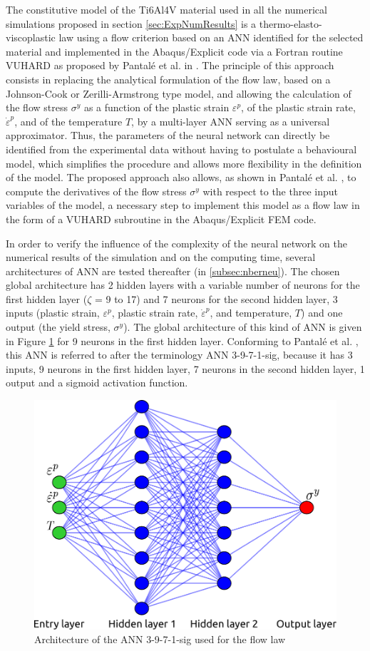 \documentclass[preprint,12pt,times]{elsarticle}
\begin{document}
The constitutive model of the Ti6Al4V material used in all the numerical simulations proposed in section \ref{sec:ExpNumResults} is a thermo-elasto-viscoplastic law using a flow criterion based on an ANN identified for the selected material and implemented in the Abaqus/Explicit code via a Fortran routine VUHARD as proposed by Pantalé et al. in \cite{pantale_Efficient_2022}.
The principle of this approach consists in replacing the analytical formulation of the flow law, based on a Johnson-Cook or Zerilli-Armstrong type model, and allowing the calculation of the flow stress $\sigma^y$ as a function of the plastic strain $\varepsilon^p$, of the plastic strain rate, ${\dot{\varepsilon}}^p$, and of the temperature $T$, by a multi-layer ANN serving as a universal approximator. Thus, the parameters of the neural network can directly be identified from the experimental data without having to postulate a behavioural model, which simplifies the procedure and allows more flexibility in the definition of the model.
The proposed approach also allows, as shown in Pantalé et al. \cite{pantale_Efficient_2022}, to compute the derivatives of the flow stress $\sigma^y$ with respect to the three input variables of the model, a necessary step to implement this model as a flow law in the form of a VUHARD subroutine in the Abaqus/Explicit FEM code.

In order to verify the influence of the complexity of the neural network on the numerical results of the simulation and on the computing time, several architectures of ANN are tested thereafter (in \ref{subsec:nberneu}). The chosen global architecture has 2 hidden layers with a variable number of neurons for the first hidden layer ($\zeta$ = 9 to 17) and 7 neurons for the second hidden layer, 3 inputs (plastic strain, $\varepsilon^p$, plastic strain rate, ${\dot{\varepsilon}}^p$, and temperature, $T$) and one output (the yield stress, $\sigma^y$). The global architecture of this kind of ANN is given in Figure \ref{fig:ANN} for 9 neurons in the first hidden layer. Conforming to Pantalé et al. \cite{pantale_Efficient_2022}, this ANN is referred to after the terminology ANN 3-9-7-1-sig, because it has 3 inputs, 9 neurons in the first hidden layer, 7 neurons in the second hidden layer, 1 output and a sigmoid activation function.

\begin{figure}[!h]
\centering
\includegraphics[width = 90 mm]{Figures/ANN}
\caption{Architecture of the ANN 3-9-7-1-sig used for the flow law}
\label{fig:ANN}
\end{figure}
\end{document}
